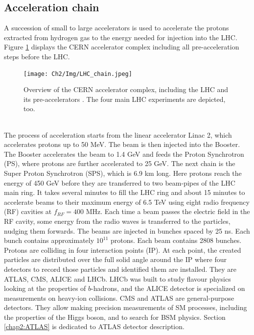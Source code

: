 \subsection{Acceleration chain}
\label{chap2:LHC:chain}
A succession of small to large accelerators is used to accelerate the protons extracted from hydrogen gas to the energy needed for injection into the LHC. Figure \ref{fig:chap2:LHC:chain} displays the CERN accelerator complex including all pre-acceleration steps before the LHC. 
\begin{figure}[htbp]
    \centering
    \texttt{[image: Ch2/Img/LHC\_chain.jpeg]}
    \caption{Overview of the CERN accelerator complex, including the LHC and its pre-accelerators \cite{LHC_chain}. The four main LHC experiments are depicted, too.}
    \label{fig:chap2:LHC:chain}
\end{figure}
\\
The process of acceleration starts from the linear accelerator Linac 2, which accelerates protons up to 50 MeV. The beam is then injected into the Booster. The Booster accelerates the beam to 1.4 GeV and feeds the Proton Synchrotron (PS), where protons are further accelerated to 25 GeV. The next chain is the Super Proton Synchrotron (SPS), which is 6.9 km long. Here protons reach the energy of 450 GeV before they are transferred to two beam-pipes of the LHC main ring. It takes several minutes to fill the LHC ring and about 15 minutes to accelerate beams to their maximum energy of 6.5 TeV using eight radio frequency (RF) cavities at $f_{RF} = 400$ MHz. Each time a beam passes the electric field in the RF cavity, some energy from the radio waves is transferred to the particles, nudging them forwards. The beams are injected in bunches spaced by 25 ns. Each bunch contains approximately $10^{11}$ protons. Each beam contains 2808 bunches. \\
Protons are colliding in four interaction points (IP). At each point, the created particles are distributed over the full solid angle around the IP where four detectors to record those particles and identified them are installed. They are ATLAS, CMS, ALICE and LHCb. LHCb was built to study flavour physics looking at the properties of $b$-hadrons, and the ALICE detector is specialized on measurements on heavy-ion collisions. CMS and ATLAS are general-purpose detectors. They allow making precision measurements of SM processes, including the properties of the Higgs boson, and to search for BSM physics. Section \ref{chap2:ATLAS} is dedicated to ATLAS detector description.

